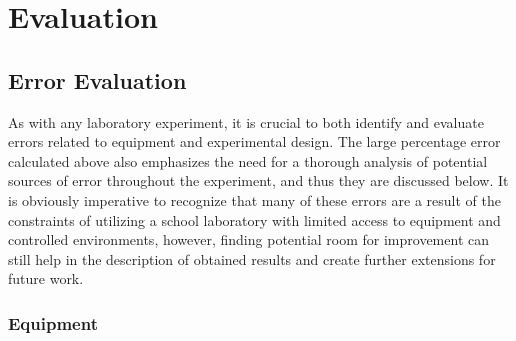 \section{Evaluation}

\subsection{Error Evaluation}

As with any laboratory experiment, it is crucial to both identify and evaluate errors related to equipment and experimental design. The large percentage error calculated above also emphasizes the need for a thorough analysis of potential sources of error throughout the experiment, and thus they are discussed below. It is obviously imperative to recognize that many of these errors are a result of the constraints of utilizing a school laboratory with limited access to equipment and controlled environments, however, finding potential room for improvement can still help in the description of obtained results and create further extensions for future work.

\subsubsection{Equipment}


